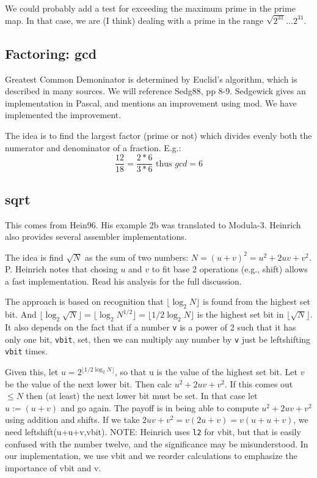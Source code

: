 We could probably add a test for exceeding the
maximum prime in the prime map.  In that case, we are (I think)
dealing with a prime in the range $\sqrt{2^{31}} \ldots 2^{31}$.    

\subsection*{Factoring: gcd}
Greatest Common Demoninator is determined by Euclid's algorithm, which
is described in many sources.  We will reference Sedg88, pp 8-9.
Sedgewick gives an implementation in Pascal, and mentions an improvement
using mod.  We have implemented the improvement.

The idea is to find the largest factor (prime or not) which divides evenly
both the numerator and denominator of a fraction.  E.g.:
  $$\frac{12}{18}=\frac{2*6}{3*6}\mbox{\  thus\  }gcd=6$$

\subsection*{sqrt}
This comes from Hein96.  His example 2b was translated to
Modula-3.  Heinrich also provides several assembler implementations.

The idea is find $\sqrt{N}$ as the sum of two numbers: $N=
(u+v)^2=u^2+2uv+v^2$.  P. Heinrich notes that chosing $u$ and $v$
to fit base 2 operations (e.g., shift) allows a fast implementation.
Read his analysis for the full discussion.

The approach is based on recognition that
$\lfloor \log_2{N}\rfloor$ is found from the highest set bit.  And
$\lfloor \log_2{\sqrt{N}}\rfloor = \lfloor\log_2N^{1/2}\rfloor
= \lfloor 1/2\log_2{N}\rfloor$
is the highest set bit in $\lfloor \sqrt{N}\rfloor$.  It also depends on
the fact that if a number {\tt v} is a power of 2 such that it
has only one bit, {\tt vbit}, set, then we can multiply any number
by {\tt v} just be leftshifting {\tt vbit} times. 

Given this, let $u=2^{\lfloor 1/2\log_2{N}\rfloor}$, so that u is the value
of the highest set bit.  Let $v$ be the value of the next lower bit.
Then calc $u^2+2uv+v^2$.  If this comes out $\le N$ then (at least) the
next lower bit must be set.  In that case let $u:=(u+v)$ and
go again.  The payoff is in being able to compute $u^2+2uv+v^2$ using
addition and shifts.  If we take $2uv+v^2 = v(2u+v)=v(u+u+v)$, we
need leftshift(u+u+v,vbit).  NOTE: Heinrich uses {\tt l2} for vbit,
but that is easily confused with the number twelve, and the significance
may be misunderstood.  In our implementation, we use vbit and we 
reorder calculations to emphasize the importance of vbit and v.

